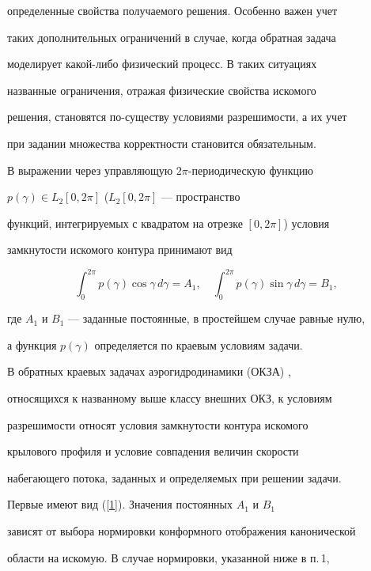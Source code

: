 определенные свойства получаемого решения. Особенно важен учет


таких дополнительных ограничений в случае, когда обратная задача


моделирует какой-либо физический процесс. В таких ситуациях


названные ограничения, отражая физические свойства искомого


решения, становятся по-существу условиями разрешимости, а их учет


при задании множества корректности становится обязательным.





В выражении через управляющую $2\pi$-периодическую функцию


$p(\gamma) \in L_2 [0, 2\pi]$ ($L_2 [0, 2\pi]$ --- пространство


функций, интегрируемых с квадратом на отрезке $[0,2\pi]$) условия


замкнутости искомого контура принимают вид


\begin{equation}\label{1}


\int_{0}^{2\pi} p(\gamma)\cos\gamma\,d\gamma


=A_1, \quad \int_{0}^{2\pi} p(\gamma)\sin\gamma\,d\gamma =B_1,


\end{equation}


где $A_1$ и $B_1$ --- заданные постоянные, в простейшем случае равные нулю,


а функция $p(\gamma)$ определяется по краевым условиям задачи.





В обратных краевых задачах аэрогидродинамики (ОКЗА) \cite{Eliz2},


относящихся к названному выше классу внешних ОКЗ, к условиям


разрешимости относят условия замкнутости контура искомого


крылового профиля и условие совпадения величин скорости


набегающего потока, заданных и определяемых при решении задачи.


Первые имеют вид (\ref{1}). Значения постоянных $A_{1}$ и $B_{1}$


зависят от выбора нормировки конформного отображения канонической


области на искомую. В случае нормировки, указанной ниже в п.\,1,


